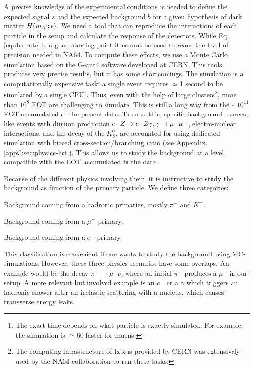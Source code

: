 A precise knowledge of the experimental conditions is needed to define the expected signal $s$ and the expected background $b$ for a given hypothesis of dark matter $H(m_{A'};\epsilon)$. We need a tool that can reproduce the interactions of each particle in the setup and calculate the response of the detectors. While Eq.\ref{eq:dm-rate} is a good starting point it cannot be used to reach the level of precision needed in NA64. To compute these effects, we use a Monte Carlo simulation based on the Geant4 software \cite{AGOSTINELLI2003250,1610988} developed at CERN. This tools produces very precise results, but it has some shortcomings. The simulation is a computationally expensive task: a single event requires $\simeq$1 second to be simulated by a single CPU\footnote{The exact time depends on what particle is exactly simulated. For example, the simulation is $\simeq$60 faster for muons.}. Thus, even with the help of large clusters\footnote{The computing infrastructure of lxplus provided by CERN was extensively used by the NA64 collaboration to run these tasks.}, more than $10^8$ EOT are challenging to simulate. This is still a long way from the $\sim 10^{11}$ EOT accumulated at the present date. 
To solve this, specific background sources, like events with dimuon production $e^- Z \to e^- Z \gamma; \gamma \to \mu^+ \mu^-$, electro-nuclear interactions, and the decay of the $K^0_S$, are accounted for using dedicated simulation with biased cross-section/branching ratio (see Appendix.\ref{appC:sec:physics-list}). This allows us to study the background at a level compatible with the EOT accumulated in the data.

Because of the different physics involving them, it is instructive to study the background as function of the primary particle. We define three categories:
\begin{description}[leftmargin=!,labelwidth=\widthof{\bfseries Electronic background}]
\item[Hadronic background] Background coming from a hadronic primaries, mostly $\pi^-$ and $K^-$.
\item[Muonic background] Background coming from a $\mu^-$ primary.
\item[Electronic background] Background coming from a $e^-$ primary.
\end{description}
This classification is convenient if one wants to study the background using MC-simulations. However, these three physics scenarios have some overlaps. An example would be the decay $\pi^- \rightarrow \mu^-\nu$, where an initial $\pi^-$ produces a $\mu^-$ in our setup. A more relevant but involved example is an $e^-$ or a $\gamma$ which triggers an hadronic shower after an inelastic scattering with a nucleus, which causes transverse energy leaks.

